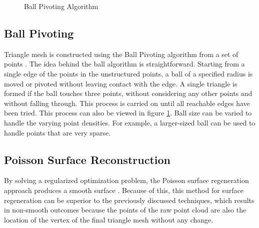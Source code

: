 \begin{figure}[htbp]
\begin{minipage}[b]{0.45\textwidth}
    \caption{Ball Pivoting Algorithm \parencite{bernardini1999ball}}
    \label{fig:related_work-ball_piv_3}
    \end{minipage}
\end{figure}


\subsection{Ball Pivoting}
Triangle mesh is constructed using the Ball Pivoting algorithm from a set of points \parencite{bernardini1999ball}. The idea behind the ball algorithm is straightforward. Starting from a single edge of the points in the unstructured points, a ball of a specified radius is moved or pivoted without leaving contact with the edge. A single triangle is formed if the ball touches three points, without considering any other points and without falling through. This process is carried on until all reachable edges have been tried. This process can also be viewed in figure \ref{fig:related_work-ball_piv_3}. Ball size can be varied to handle the varying point densities. For example, a larger-sized ball can be used to handle points that are very sparse.

\subsection{Poisson Surface Reconstruction}
By solving a regularized optimization problem, the Poisson surface regeneration approach produces a smooth surface \parencite{kazhdan2006poisson}. Because of this, this method for surface regeneration can be superior to the previously discussed techniques, which results in non-smooth outcomes because the points of the raw point cloud are also the location of the vertex of the final triangle mesh without any change. 

